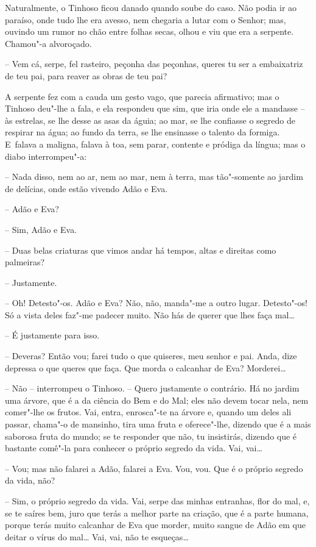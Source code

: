 Naturalmente, o Tinhoso ficou danado quando soube do caso. Não podia ir
ao paraíso, onde tudo lhe era avesso, nem chegaria a lutar com o Senhor;
mas, ouvindo um rumor no chão entre folhas secas, olhou e viu que era a
serpente. Chamou"-a alvoroçado.

-- Vem cá, serpe, fel rasteiro, peçonha das peçonhas, queres tu ser a
embaixatriz de teu pai, para reaver as obras de teu pai?

A serpente fez com a cauda um gesto vago, que parecia afirmativo; mas o
Tinhoso deu"-lhe a fala, e ela respondeu que sim, que iria onde ele a
mandasse -- às estrelas, se lhe desse as asas da águia; ao mar, se lhe
confiasse o segredo de respirar na água; ao fundo da terra, se lhe
ensinasse o talento da formiga. E~falava a maligna, falava à toa, sem
parar, contente e pródiga da língua; mas o diabo interrompeu"-a:

-- Nada disso, nem ao ar, nem ao mar, nem à terra, mas tão"-somente ao
jardim de delícias, onde estão vivendo Adão e Eva.

-- Adão e Eva?

-- Sim, Adão e Eva.

-- Duas belas criaturas que vimos andar há tempos, altas e direitas como
palmeiras?

-- Justamente.

-- Oh! Detesto"-os. Adão e Eva? Não, não, manda"-me a outro lugar.
Detesto"-os! Só a vista deles faz"-me padecer muito. Não hás de querer que
lhes faça mal\ldots{}

-- É justamente para isso.

-- Deveras? Então vou; farei tudo o que quiseres, meu senhor e pai.
Anda, dize depressa o que queres que faça. Que morda o calcanhar de Eva?
Morderei\ldots{}

-- Não -- interrompeu o Tinhoso. -- Quero justamente o contrário. Há no
jardim uma árvore, que é a da ciência do Bem e do Mal; eles não devem
tocar nela, nem comer"-lhe os frutos. Vai, entra, enrosca"-te na árvore e,
quando um deles ali passar, chama"-o de mansinho, tira uma fruta e
oferece"-lhe, dizendo que é a mais saborosa fruta do mundo; se te
responder que não, tu insistirás, dizendo que é bastante comê"-la para
conhecer o próprio segredo da vida. Vai, vai\ldots{}

-- Vou; mas não falarei a Adão, falarei a Eva. Vou, vou. Que é o próprio
segredo da vida, não?

-- Sim, o próprio segredo da vida. Vai, serpe das minhas entranhas, flor
do mal, e, se te saíres bem, juro que terás a melhor parte na criação,
que é a parte humana, porque terás muito calcanhar de Eva que morder,
muito sangue de Adão em que deitar o vírus do mal\ldots{} Vai, vai, não te
esqueças\ldots{}

